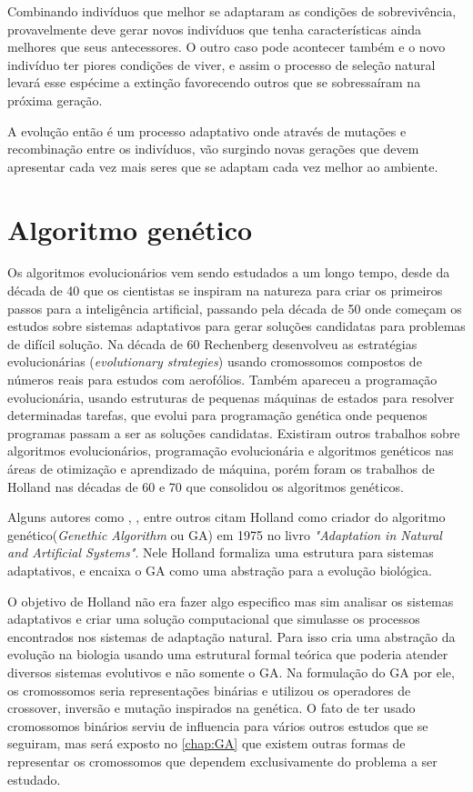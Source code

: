 Combinando indivíduos que melhor se adaptaram as condições de sobrevivência, provavelmente deve gerar novos indivíduos que tenha características ainda melhores que seus antecessores. O outro caso pode acontecer também e o novo indivíduo ter piores condições de viver, e assim o processo de seleção natural levará esse espécime a extinção favorecendo outros que se sobressaíram na próxima geração.

A evolução então é um processo adaptativo onde através de mutações e recombinação entre os indivíduos, vão surgindo novas gerações que devem apresentar cada vez mais seres que se adaptam cada vez melhor ao ambiente.

\section{Algoritmo genético}

Os algoritmos evolucionários vem sendo estudados a um longo tempo, desde da década de 40 que os cientistas se inspiram na natureza para criar os primeiros passos para a inteligência artificial, passando pela década de 50 onde começam os estudos sobre sistemas adaptativos para gerar soluções candidatas para problemas de difícil solução. Na década de 60 Rechenberg desenvolveu as estratégias evolucionárias (\textit{evolutionary strategies}) usando cromossomos compostos de números reais para estudos com aerofólios. Também apareceu a programação evolucionária, usando estruturas de pequenas máquinas de estados para resolver determinadas tarefas, que evolui para programação genética onde pequenos programas passam a ser as soluções candidatas. Existiram outros trabalhos sobre algoritmos evolucionários, programação evolucionária e algoritmos genéticos nas áreas de otimização e aprendizado de máquina, porém foram os trabalhos de Holland nas décadas de 60 e 70 que consolidou os algoritmos genéticos. \cite{Mitchell1996, Linden2008}

Alguns autores como \citeauthor{Mitchell1996}, \citeauthor{LeeJacobson2015}, \citeauthor{Kwong2001} entre outros citam Holland como criador do algoritmo genético(\textit{Genethic Algorithm} ou GA) em 1975 no livro \textit{"Adaptation in Natural and Artificial Systems"}. Nele Holland formaliza uma estrutura para sistemas adaptativos, e encaixa o GA como uma abstração para a evolução biológica.

O objetivo de Holland não era fazer algo especifico mas sim analisar os sistemas adaptativos e criar uma solução computacional que simulasse os processos encontrados nos sistemas de adaptação natural. Para isso cria uma abstração da evolução na biologia usando uma estrutural formal teórica que poderia atender diversos sistemas evolutivos e não somente o GA. Na formulação do GA por ele, os cromossomos seria representações binárias e utilizou os operadores de crossover, inversão e mutação inspirados na genética. O fato de ter usado cromossomos binários serviu de influencia para vários outros estudos que se seguiram, mas será exposto no \autoref{chap:GA} que existem outras formas de representar os cromossomos que dependem exclusivamente do problema a ser estudado.

